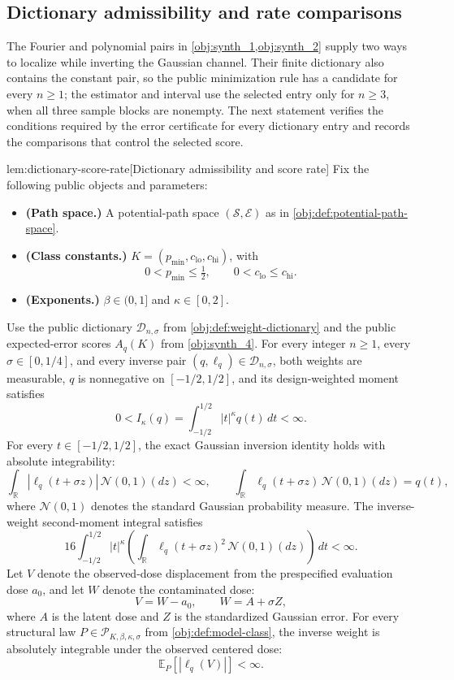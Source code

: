 \documentclass[11pt]{article}
\begin{document}
\subsection{Dictionary admissibility and rate comparisons}

The Fourier and polynomial pairs in \cref{obj:synth_1,obj:synth_2} supply two ways to localize while inverting the Gaussian channel. Their finite dictionary also contains the constant pair, so the public minimization rule has a candidate for every \(n\ge1\); the estimator and interval use the selected entry only for \(n\ge3\), when all three sample blocks are nonempty. The next statement verifies the conditions required by the error certificate for every dictionary entry and records the comparisons that control the selected score.

\begin{lemmav}{lem:dictionary-score-rate}[Dictionary admissibility and score rate]
Fix the following public objects and parameters:
\begin{itemize}
\item \textbf{(Path space.)} A potential-path space \((\mathcal S,\mathcal E)\) as in \cref{obj:def:potential-path-space}.
\item \textbf{(Class constants.)} \(K=(p_{\min},c_{\mathrm{lo}},c_{\mathrm{hi}})\), with
\[
0<p_{\min}\le \tfrac12,
\qquad
0<c_{\mathrm{lo}}\le c_{\mathrm{hi}}.
\]
\item \textbf{(Exponents.)} \(\beta\in(0,1]\) and \(\kappa\in[0,2]\).
\end{itemize}
Use the public dictionary \(\mathcal D_{n,\sigma}\) from \cref{obj:def:weight-dictionary} and the public expected-error scores \(A_q(K)\) from \cref{obj:synth_4}. For every integer \(n\ge1\), every \(\sigma\in[0,1/4]\), and every inverse pair \((q,\ell_q)\in\mathcal D_{n,\sigma}\), both weights are measurable, \(q\) is nonnegative on \([-1/2,1/2]\), and its design-weighted moment satisfies
\[
0<I_\kappa(q)
=
\int_{-1/2}^{1/2}|t|^\kappa q(t)\,dt
<\infty.
\]
For every \(t\in[-1/2,1/2]\), the exact Gaussian inversion identity holds with absolute integrability:
\[
\int_{\mathbb R}|\ell_q(t+\sigma z)|\,\mathcal N(0,1)(dz)<\infty,
\qquad
\int_{\mathbb R}\ell_q(t+\sigma z)\,\mathcal N(0,1)(dz)=q(t),
\]
where \(\mathcal N(0,1)\) denotes the standard Gaussian probability measure. The inverse-weight second-moment integral satisfies
\[
16\int_{-1/2}^{1/2}|t|^\kappa
\left(\int_{\mathbb R}\ell_q(t+\sigma z)^2\,\mathcal N(0,1)(dz)\right)\,dt
<\infty.
\]
Let \(V\) denote the observed-dose displacement from the prespecified evaluation dose \(a_0\), and let \(W\) denote the contaminated dose:
\[
V=W-a_0,
\qquad
W=A+\sigma Z,
\]
where \(A\) is the latent dose and \(Z\) is the standardized Gaussian error. For every structural law \(P\in\mathcal P_{K,\beta,\kappa,\sigma}\) from \cref{obj:def:model-class}, the inverse weight is absolutely integrable under the observed centered dose:
\[
\mathbb E_P[|\ell_q(V)|]<\infty.
\]


\end{lemmav}
\end{document}
